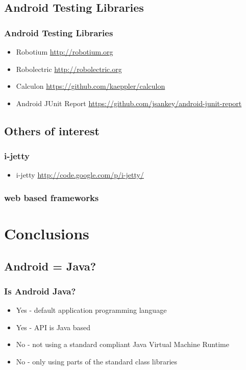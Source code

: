 \documentclass{beamer}
\begin{document}
  \subsection{Android Testing Libraries}

    \begin{frame}
      \frametitle{Android Testing Libraries}
      \begin{itemize}
        \item<1->Robotium \url{http://robotium.org}
        \item<2->Robolectric \url{http://robolectric.org}
        \item<3->Calculon \url{https://github.com/kaeppler/calculon}
        \item<4->Android JUnit Report \url{https://github.com/jsankey/android-junit-report}
      \end{itemize}
    \end{frame}


  \subsection{Others of interest}  

    \begin{frame}
      \frametitle{i-jetty}
      \begin{itemize}
       \item i-jetty \url{http://code.google.com/p/i-jetty/}
      \end{itemize}

    \end{frame}

    \begin{frame}
      \frametitle{web based frameworks}
    \end{frame}

\section{Conclusions}

  \subsection{Android = Java?}
    \begin{frame}
      \frametitle{Is Android Java?}
      \begin{itemize}
      \item<1-> Yes - default application programming language
      \item<2-> Yes - API is Java based
      \item<3-> No - not using a standard compliant Java Virtual Machine Runtime
      \item<4-> No - only using parts of the standard class libraries
      \end{itemize}
    \end{frame}
\end{document}

